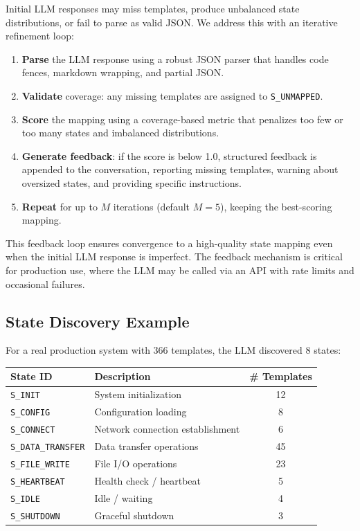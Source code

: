 \documentclass[11pt]{article}
\begin{document}
Initial LLM responses may miss templates, produce unbalanced state distributions, or fail to parse as valid JSON. We address this with an iterative refinement loop:

\begin{enumerate}[leftmargin=*,itemsep=2pt]
    \item \textbf{Parse} the LLM response using a robust JSON parser that handles code fences, markdown wrapping, and partial JSON.
    
    \item \textbf{Validate} coverage: any missing templates are assigned to \texttt{S\_UNMAPPED}.
    
    \item \textbf{Score} the mapping using a coverage-based metric that penalizes too few or too many states and imbalanced distributions.
    
    \item \textbf{Generate feedback}: if the score is below 1.0, structured feedback is appended to the conversation, reporting missing templates, warning about oversized states, and providing specific instructions.
    
    \item \textbf{Repeat} for up to $M$ iterations (default $M = 5$), keeping the best-scoring mapping.
\end{enumerate}

This feedback loop ensures convergence to a high-quality state mapping even when the initial LLM response is imperfect. The feedback mechanism is critical for production use, where the LLM may be called via an API with rate limits and occasional failures.

\subsection{State Discovery Example}

For a real production system with 366 templates, the LLM discovered 8 states:

\begin{center}
\begin{tabular}{llc}
\toprule
\textbf{State ID} & \textbf{Description} & \textbf{\# Templates} \\
\midrule
\texttt{S\_INIT}            & System initialization & 12 \\
\texttt{S\_CONFIG}          & Configuration loading & 8 \\
\texttt{S\_CONNECT}         & Network connection establishment & 6 \\
\texttt{S\_DATA\_TRANSFER}   & Data transfer operations & 45 \\
\texttt{S\_FILE\_WRITE}      & File I/O operations & 23 \\
\texttt{S\_HEARTBEAT}       & Health check / heartbeat & 5 \\
\texttt{S\_IDLE}            & Idle / waiting & 4 \\
\texttt{S\_SHUTDOWN}        & Graceful shutdown & 3 \\
\bottomrule
\end{tabular}
\end{center}
\end{document}
